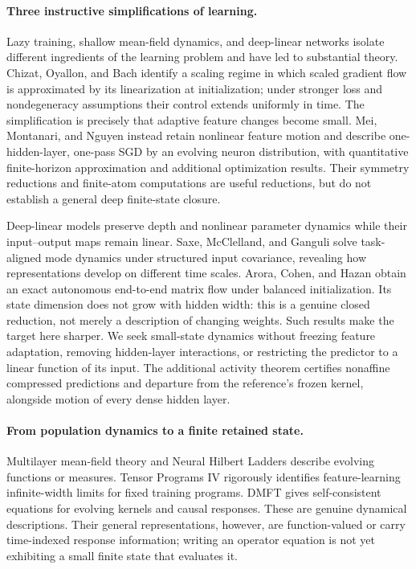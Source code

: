 \documentclass[11pt]{article}
\theoremstyle{definition}
\theoremstyle{remark}
\begin{document}
\paragraph{Three instructive simplifications of learning.}
Lazy training, shallow mean-field dynamics, and deep-linear networks isolate
different ingredients of the learning problem and have led to substantial
theory. Chizat, Oyallon, and Bach \cite{chizat2019lazy} identify a scaling
regime in which scaled gradient flow is approximated by its linearization
at initialization; under stronger
loss and nondegeneracy assumptions their control extends uniformly in time.
The simplification is precisely that adaptive feature changes become small.
Mei, Montanari, and Nguyen \cite{mei2018meanfield} instead retain nonlinear
feature motion and describe one-hidden-layer, one-pass SGD by an evolving neuron
distribution, with quantitative finite-horizon approximation and additional
optimization results. Their symmetry reductions and finite-atom computations
are useful reductions, but do not establish a general deep finite-state closure.

Deep-linear models preserve depth and nonlinear parameter dynamics while
their input--output maps remain linear. Saxe, McClelland, and Ganguli
\cite{saxe2014exact} solve task-aligned mode dynamics under structured input
covariance, revealing how representations develop on different time scales.
Arora, Cohen, and Hazan \cite{arora2018implicit} obtain an exact autonomous
end-to-end matrix flow under balanced initialization. Its state dimension
does not grow with hidden width: this is a genuine closed reduction, not
merely a description of changing weights. Such results make the target here
sharper. We seek small-state dynamics without freezing feature adaptation,
removing hidden-layer interactions, or restricting the predictor to a linear
function of its input. The additional activity theorem certifies
nonaffine compressed predictions and departure from the reference's frozen
kernel, alongside motion of every dense hidden layer.

\paragraph{From population dynamics to a finite retained state.}
Multilayer mean-field theory \cite{nguyen2023rigorous} and Neural Hilbert
Ladders \cite{chen2024ladders} describe evolving functions or measures.
Tensor Programs IV \cite{yang2021tensor} rigorously identifies
feature-learning infinite-width limits for fixed training programs.
DMFT \cite{bordelon2022dmft} gives self-consistent equations for evolving
kernels and causal responses. These are genuine dynamical descriptions.
Their general representations, however, are function-valued or carry
time-indexed response information; writing an operator equation is not yet
exhibiting a small finite state that evaluates it.
\end{document}
